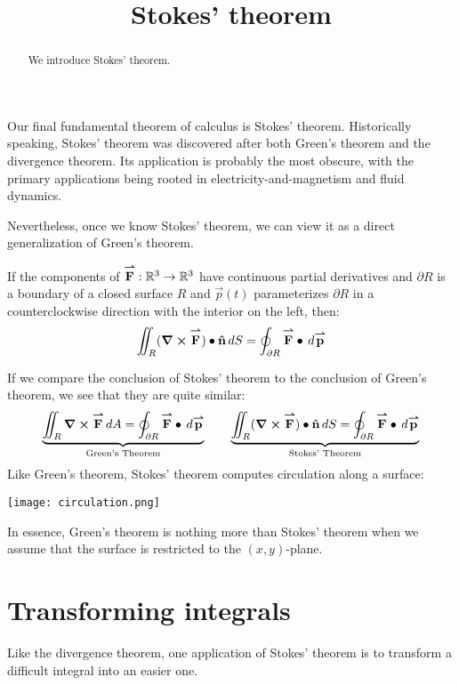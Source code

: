 \documentclass{ximera}
\title[Dig-In:]{Stokes' theorem}
\begin{document}
\begin{abstract}
  We introduce Stokes' theorem.
\end{abstract}
\maketitle

\renewcommand{\d}{\,d}

Our final fundamental theorem of calculus is Stokes'
theorem. Historically speaking, Stokes' theorem was discovered after
both Green's theorem and the divergence theorem. Its application is
probably the most obscure, with the primary applications being rooted
in electricity-and-magnetism and fluid dynamics.

Nevertheless, once we know Stokes' theorem, we can view it as a direct
generalization of Green's theorem.

\begin{theorem}
  If the components of ${\overset{\boldsymbol{\rightharpoonup}}{\mathbf{F}}}\hspace{0in}:\mathbb R^3\to\mathbb R^3$ have continuous partial
  derivatives and $\partial R$ is a boundary of a closed surface $R$
  and $\vec{p}(t)$ parameterizes $\partial R$ in a counterclockwise
  direction with the interior on the left, then:
  \[
  \iint_R (\curl \vec{F})\dotp \uvec{n}\d S = \oint_{\partial R}
  \vec{F}\dotp\d\vec{p}
  \]
\end{theorem}

If we compare the conclusion of Stokes' theorem to the conclusion of
Green's theorem, we see that they are quite similar:
  \[
  \underbrace{\iint_R \curl\vec{F}\d A = \oint_{\partial R} \vec{F}\dotp\d\vec{p}}_{\text{Green's Theorem}}\qquad \underbrace{\iint_R (\curl \vec{F})\dotp \uvec{n}\d S = \oint_{\partial R}
  \vec{F}\dotp\d\vec{p}}_{\text{Stokes' Theorem}}
  \]
  Like Green's theorem, Stokes' theorem computes circulation along a surface:
  \begin{image}
    \texttt{[image: circulation.png]}
  \end{image}
  In essence, Green's theorem is nothing more than Stokes' theorem
  when we assume that the surface is restricted to the $(x,y)$-plane.


\section{Transforming integrals}

Like the divergence theorem, one application of Stokes' theorem is to
transform a difficult integral into an easier one.
\end{document}
